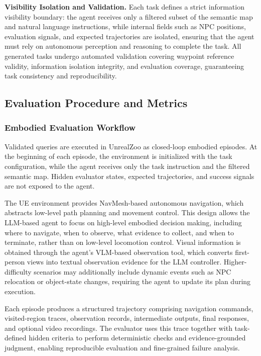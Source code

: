 \textbf{Visibility Isolation and Validation.} Each task defines a strict information visibility boundary: the agent receives only a filtered subset of the semantic map and natural language instructions, while internal fields such as NPC positions, evaluation signals, and expected trajectories are isolated, ensuring that the agent must rely on autonomous perception and reasoning to complete the task. All generated tasks undergo automated validation covering waypoint reference validity, information isolation integrity, and evaluation coverage, guaranteeing task consistency and reproducibility.

\subsection{Evaluation Procedure and Metrics}
\label{sec:evaluation}

\subsubsection{Embodied Evaluation Workflow}
\label{sec:sim-pipeline}

Validated queries are executed in UnrealZoo as closed-loop embodied episodes. At the beginning of each episode, the environment is initialized with the task configuration, while the agent receives only the task instruction and the filtered semantic map. Hidden evaluator states, expected trajectories, and success signals are not exposed to the agent.

The UE environment provides NavMesh-based autonomous navigation, which abstracts low-level path planning and movement control. This design allows the LLM-based agent to focus on high-level embodied decision making, including where to navigate, when to observe, what evidence to collect, and when to terminate, rather than on low-level locomotion control. Visual information is obtained through the agent's VLM-based observation tool, which converts first-person views into textual observation evidence for the LLM controller. Higher-difficulty scenarios may additionally include dynamic events such as NPC relocation or object-state changes, requiring the agent to update its plan during execution.

Each episode produces a structured trajectory comprising navigation commands, visited-region traces, observation records, intermediate outputs, final responses, and optional video recordings. The evaluator uses this trace together with task-defined hidden criteria to perform deterministic checks and evidence-grounded judgment, enabling reproducible evaluation and fine-grained failure analysis.


